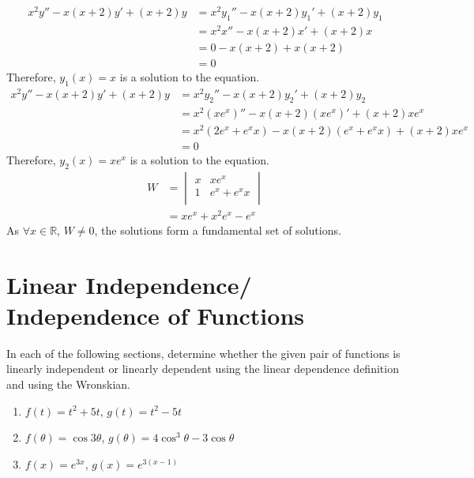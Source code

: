 \documentclass[fleqn, a4paper, 11pt, oneside]{amsart}
\theoremstyle{definition}
\theoremstyle{theorem}
\begin{document}
\begin{solution}
	\begin{align*}
		x^2 y'' - x (x + 2) y' + (x + 2) y & = x^2 {y_1}'' - x (x + 2) {y_1}' + (x + 2) y_1 \\
                                                   & = x^2 x'' - x (x + 2) x' + (x + 2) x           \\
                                                   & = 0 - x (x + 2) + x (x + 2)                    \\
                                                   & = 0
	\end{align*}
	Therefore, $y_1(x) = x$ is a solution to the equation.
	\begin{align*}
		x^2 y'' - x (x + 2) y' + (x + 2) y & = x^2 {y_2}'' - x (x + 2) {y_2}' + (x + 2) y_2                                            \\
                                                   & = x^2 \left( x e^x \right)'' - x (x + 2) \left( x e^x \right)' + (x + 2) x e^x            \\
                                                   & = x^2 \left( 2 e^x + e^x x \right) - x (x + 2) \left( e^x + e^x x \right) + (x + 2) x e^x \\
                                                   & = 0
	\end{align*}
	Therefore, $y_2(x) = x e^x$ is a solution to the equation.\\
	\begin{align*}
		W &=
			\begin{vmatrix}
				x & x e^x       \\
				1 & e^x + e^x x \\
			\end{vmatrix}\\
		  &= x e^x + x^2 e^x - e^x
	\end{align*}
	As $\forall x \in \mathbb{R}$, $W \neq 0$, the solutions form a fundamental set of solutions.
\end{solution}

\part{Linear Independence/ Independence of Functions}

\begin{question}
	In each of the following sections, determine whether the given pair of functions is linearly independent or linearly dependent using the linear dependence definition and using the Wronskian.
	\begin{enumerate}
		\item $f(t) = t^2 + 5 t$, $g(t) = t^2 - 5 t$
		\item $f(\theta) = \cos 3 \theta$, $g(\theta) = 4 \cos^3 \theta - 3 \cos \theta$
		\item $f(x) = e^{3 x}$, $g(x) = e^{3 (x - 1)}$
	\end{enumerate}
\end{question}
\end{document}
